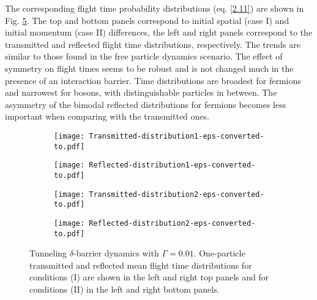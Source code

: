 \documentclass[preprint,aps]{revtex4}
\begin{document}
The corresponding flight time probability distributions (eq. \ref{2.11}) are shown in Fig. \ref{fig4}.  
The top and bottom panels correspond to initial spatial (case I) and initial momentum (case II) differences, the left and right panels correspond to the transmitted and reflected flight time distributions, respectively. The trends are similar to those found in the free particle dynamics scenario. The effect of symmetry on flight times seems to be robust and is not changed much in the presence of an interaction barrier. Time distributions are broadest for fermions and narrowest for bosons, with distinguishable particles in between. The asymmetry of the bimodal reflected distributions for fermions becomes less important when comparing with the transmitted ones. 


%
\begin{figure}
	\begin{subfigure}[t]{0.45\textwidth}
		\texttt{[image: Transmitted-distribution1-eps-converted-to.pdf]}
		\label{fig1a}
	\end{subfigure}
	\hfill
	\begin{subfigure}[t]{0.45\textwidth}
		\texttt{[image: Reflected-distribution1-eps-converted-to.pdf]}
		\label{fig1b}
	\end{subfigure}
	
	\begin{subfigure}[b]{0.45\textwidth}
		\texttt{[image: Transmitted-distribution2-eps-converted-to.pdf]}
		\label{fig1c}
	\end{subfigure}
	\hfill
	\begin{subfigure}[b]{0.45\textwidth}
		\texttt{[image: Reflected-distribution2-eps-converted-to.pdf]}
		\label{fig1d}
	\end{subfigure}
	\caption{Tunneling $\delta$-barrier dynamics with $\Gamma= 0.01$. One-particle transmitted and reflected mean flight time distributions  for  conditions (I) are shown in the  left and right top panels and  for conditions (II)  in the left and right bottom panels.  } \label{fig4}
\end{figure} 
\end{document}
